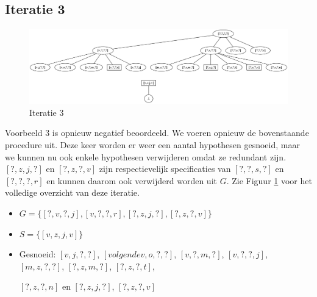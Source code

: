 \documentclass[alternative-exam.tex]{subfiles}
\begin{document}
\subsection{Iteratie 3}
\begin{figure}
\centering
\caption{Iteratie 3}
\label{iter_3}
\includegraphics[scale=0.35]{resources/graphs/iteration_3.png}
\end{figure}
Voorbeeld $3$ is opnieuw negatief beoordeeld. We voeren opnieuw de bovenstaande procedure uit. Deze keer worden er weer een aantal hypothesen gesnoeid, maar we kunnen nu ook enkele hypothesen verwijderen omdat ze redundant zijn. $[?,z,j,?]$ en $[?,z,?,v]$ zijn respectievelijk specificaties van $[?,?,s,?]$ en $[?,?,?,r]$ en kunnen daarom ook verwijderd worden uit $G$. Zie Figuur \ref{iter_3} voor het volledige overzicht van deze iteratie.
\begin{itemize}
\item $G = \{[?,v,?,j],[v,?,?,r],[?,z,j,?],[?,z,?,v]\}$
\item $S = \{[v,z,j,v]\}$
\item Gesnoeid: $[v,j,?,?]$, $[volgendev,o,?,?]$, $[v,?,m,?]$, $[v,?,?,j]$, $[m,z,?,?]$, $[?,z,m,?]$, $[?,z,?,t]$,

$[?,z,?,n]$ en $[?,z,j,?]$, $[?,z,?,v]$
\end{itemize}
\end{document}
